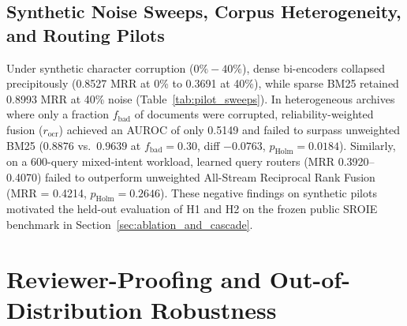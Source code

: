 \documentclass[conference]{IEEEtran}
\begin{document}
\subsection{Synthetic Noise Sweeps, Corpus Heterogeneity, and Routing Pilots}
\label{sec:diagnostic_extensions}
\label{sec:coco_eval}
Under synthetic character corruption ($0\%-40\%$), dense bi-encoders collapsed precipitously (0.8527 MRR at 0\% to 0.3691 at 40\%), while sparse BM25 retained 0.8993 MRR at 40\% noise (Table~\ref{tab:pilot_sweeps}). In heterogeneous archives where only a fraction $f_{\text{bad}}$ of documents were corrupted, reliability-weighted fusion ($r_{\text{ocr}}$) achieved an AUROC of only 0.5149 and failed to surpass unweighted BM25 ($0.8876$ vs.\ $0.9639$ at $f_{\text{bad}}=0.30$, diff $-0.0763$, $p_{\text{Holm}}=0.0184$). Similarly, on a 600-query mixed-intent workload, learned query routers (MRR 0.3920--0.4070) failed to outperform unweighted All-Stream Reciprocal Rank Fusion (MRR = 0.4214, $p_{\text{Holm}}=0.2646$). These negative findings on synthetic pilots motivated the held-out evaluation of H1 and H2 on the frozen public SROIE benchmark in Section~\ref{sec:ablation_and_cascade}.

\begin{table}[h]
\centering
\small
\caption{Preliminary Synthetic Noise Sweeps, Heterogeneous Corruption ($f_{\text{bad}}$), and Mixed-Intent Routing ($N=600$).}
\label{tab:pilot_sweeps}
\end{table}




\section{Reviewer-Proofing and Out-of-Distribution Robustness}
\label{sec:appendix_reviewer_proofing}
\end{document}
